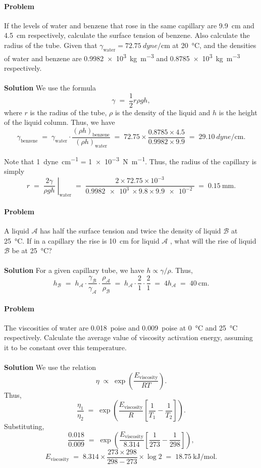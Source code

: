 \documentclass[10pt]{article}
\newcounter{prob}
\def\problem{\stepcounter{prob}\paragraph{Problem \arabic{prob}}}
\def\solution{\\\\\textbf{Solution }}
\begin{document}
        \problem If the levels of water and benzene that rose in the same capillary are \SI{9.9}{\cm} and \SI{4.5}{\cm} respectively,
        calculate the surface tension of benzene. Also calculate the radius of the tube.
        Given that $\gamma_\text{water} = \SI{72.75}{dyne\per\cm}$ at \SI{20}{\celsius}, and the densities of water and benzene are
        \SI{0.9982e3}{\kg\per\m^3} and \SI{0.8785e3}{\kg\per\m^3} respectively.
        \solution We use the formula 
        \[
                \gamma \;=\; \frac{1}{2}r\rho gh,
        \]
        where $r$ is the radius of the tube, $\rho$ is the density of the liquid and $h$ is the height of the liquid column.
        Thus, we have
        \[\gamma_\text{benzene} \;=\; \gamma_\text{water}\cdot\frac{(\rho h)_\text{benzene}}{(\rho h)_\text{water}}
                \;=\; 72.75\times\frac{0.8785 \times 4.5}{0.9982 \times 9.9} \;=\; \SI{29.10}{dyne\per\cm}.\]
        
        Note that \SI{1}{dyne\per\cm} = \SI{1e-3}{\newton\per\m}.
        Thus, the radius of the capillary is simply
        \[
        r \;=\; \left.\frac{2\gamma}{\rho gh}\;\right|_\text{water} \;=\; \frac{2\times 72.75\times 10^{-3}}{\SI{0.9982e3}{}\times 9.8\times \SI{9.9e-2}{}}
                \;=\; \SI{0.15}{\mm}.
        \]

        \problem A liquid $\mathcal{A}$ has half the surface tension and twice the density of liquid $\mathcal{B}$ at \SI{25}{\celsius}.
        If in a capillary the rise is \SI{10}{\cm} for liquid $\mathcal{A}$ , what will the rise of liquid $\mathcal{B}$ be at \SI{25}{\celsius}? 
        \solution For a given capillary tube, we have $h \propto {\gamma}/{\rho}$. Thus,
        \[
        h_\mathcal{B} \;=\; h_\mathcal{A}\cdot\frac{\gamma_\mathcal{B}}{\gamma_\mathcal{A}}\cdot\frac{\rho_\mathcal{A}}{\rho_\mathcal{B}}
                \;=\; h_\mathcal{A}\cdot \frac{2}{1}\cdot \frac{2}{1} \;=\; 4 h_\mathcal{A} \;=\; \SI{40}{\cm}.
        \]

        \problem The viscosities of water are \SI{0.018}{poise} and \SI{0.009}{poise} at \SI{0}{\celsius} and \SI{25}{\celsius} respectively.
        Calculate the average value of viscosity activation energy, assuming it to be constant over this temperature.
        \solution We use the relation
        \[
        \eta \;\propto\; \exp\left(\frac{E_\text{viscosity}}{RT}\right).
        \]
        Thus,
        \[
        \frac{\eta_1}{\eta_2} \;=\; \exp\left(\frac{E_\text{viscosity}}{R}\left[\frac{1}{T_1} - \frac{1}{T_2}\right]\right) .
        \]
        Substituting,
        \[
        \frac{0.018}{0.009} \;=\; \exp\left(\frac{E_\text{viscosity}}{8.314}\left[\frac{1}{273} - \frac{1}{298}\right]\right),
        \]
        \[
        E_\text{viscosity} \;=\; 8.314\times\frac{273\times 298}{298 - 273}\times \log{2} \;=\; \SI{18.75}{\kilo\joule\per\mole}.
        \]
\end{document}
